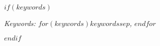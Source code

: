 \maketitle
\thispagestyle{fancy}

$if(keywords)$
\begin{center}
    \textit{Keywords: $for(keywords)$$keywords$$sep$, $endfor$}
    \newline
\end{center}
$endif$
